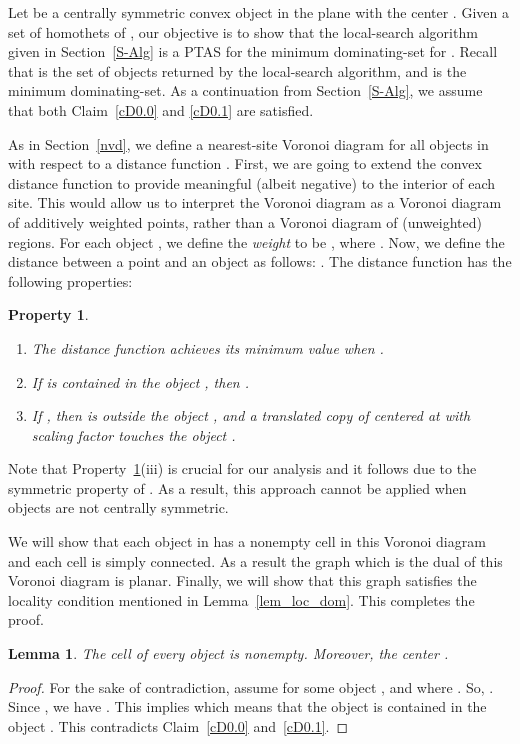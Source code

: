 \documentclass[a4paper,11pt]{article}
\newtheorem{lemma}{Lemma}
\newtheorem{property}{Property}
\begin{document}
Let  be a centrally symmetric convex object in the plane with the center .
Given a set   of homothets  of  , our objective is to show that  the local-search algorithm given in Section~\ref{S-Alg} is a PTAS for the minimum dominating-set for .  
  Recall  that   is  the set of objects returned by the  local-search algorithm, and   is the minimum dominating-set. As a continuation from Section~\ref{S-Alg}, we assume that both Claim~\ref{cD0.0} and \ref{cD0.1} are satisfied.  

As in Section~\ref{nvd}, we define a nearest-site Voronoi diagram for all objects in  with respect to a distance function .
First, we are going to extend the convex distance function to provide meaningful (albeit negative) to the interior of each site. This would allow us to interpret the Voronoi diagram as a Voronoi diagram of additively weighted points, rather than a Voronoi diagram of (unweighted) regions. For each  object , we define the \emph{weight}  to be , where .
  Now, we define the  distance  between a point  and an object  as follows: . The  distance function  has the following properties:

\begin{property}
\label{p6}
\begin{enumerate}[label=(\roman*)]
\item The distance function  achieves its minimum value when .
\item If  is contained in the object , then
.
\item If , then  is outside the object , 
and a translated copy of  centered at  with 
 scaling factor   touches the object .
\end{enumerate}
\end{property}
Note that Property~\ref{p6}(iii) is crucial for our analysis and it follows due to the symmetric property of . As a result, this approach cannot
be applied when objects are not centrally symmetric.


 We will show that each object in  has a nonempty cell in this Voronoi diagram and each cell is simply connected. As a result the graph   which  is the dual of this Voronoi diagram is planar. Finally, we will show that this graph satisfies the locality condition mentioned in Lemma~\ref{lem_loc_dom}. This completes the proof.

\begin{lemma}\label{Al1}
 The cell of every object  is nonempty. 
Moreover, 
 the center . 
\end{lemma}
\begin{proof}
For the sake of contradiction, assume for some object ,  and  where . So, . Since , we have . This implies  which means that the object  is contained in the object . This contradicts Claim~\ref{cD0.0} and~\ref{cD0.1}. 
\end{proof}
\end{document}
